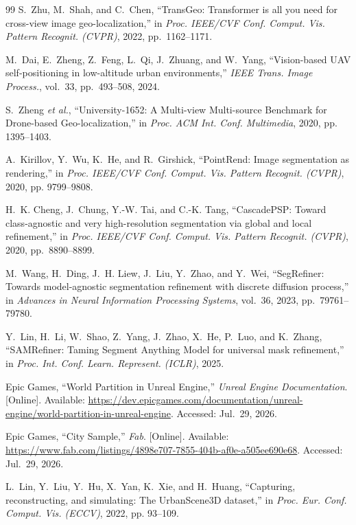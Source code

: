 \documentclass[letterpaper,journal]{IEEEtran}
\begin{document}
\begin{thebibliography}{99}
S.~Zhu, M.~Shah, and C.~Chen, ``TransGeo: Transformer is all you need for cross-view image geo-localization,'' in \textit{Proc. IEEE/CVF Conf. Comput. Vis. Pattern Recognit. (CVPR)}, 2022, pp.~1162--1171.

M.~Dai, E.~Zheng, Z.~Feng, L.~Qi, J.~Zhuang, and W.~Yang, ``Vision-based UAV self-positioning in low-altitude urban environments,'' \textit{IEEE Trans. Image Process.}, vol.~33, pp.~493--508, 2024.

S.~Zheng \textit{et al.}, ``University-1652: A Multi-view Multi-source Benchmark for Drone-based Geo-localization,'' in \textit{Proc. ACM Int. Conf. Multimedia}, 2020, pp. 1395--1403.

A.~Kirillov, Y.~Wu, K.~He, and R.~Girshick, ``PointRend: Image segmentation as rendering,'' in \textit{Proc. IEEE/CVF Conf. Comput. Vis. Pattern Recognit. (CVPR)}, 2020, pp. 9799--9808.

H.~K. Cheng, J.~Chung, Y.-W. Tai, and C.-K. Tang, ``CascadePSP: Toward class-agnostic and very high-resolution segmentation via global and local refinement,'' in \textit{Proc. IEEE/CVF Conf. Comput. Vis. Pattern Recognit. (CVPR)}, 2020, pp.~8890--8899.

M.~Wang, H.~Ding, J.~H. Liew, J.~Liu, Y.~Zhao, and Y.~Wei, ``SegRefiner: Towards model-agnostic segmentation refinement with discrete diffusion process,'' in \textit{Advances in Neural Information Processing Systems}, vol.~36, 2023, pp.~79761--79780.

Y.~Lin, H.~Li, W.~Shao, Z.~Yang, J.~Zhao, X.~He, P.~Luo, and K.~Zhang, ``SAMRefiner: Taming Segment Anything Model for universal mask refinement,'' in \textit{Proc. Int. Conf. Learn. Represent. (ICLR)}, 2025.

Epic Games, ``World Partition in Unreal Engine,'' \textit{Unreal Engine Documentation}. [Online]. Available: \url{https://dev.epicgames.com/documentation/unreal-engine/world-partition-in-unreal-engine}. Accessed: Jul.~29, 2026.

Epic Games, ``City Sample,'' \textit{Fab}. [Online]. Available: \url{https://www.fab.com/listings/4898e707-7855-404b-af0e-a505ee690e68}. Accessed: Jul.~29, 2026.

L.~Lin, Y.~Liu, Y.~Hu, X.~Yan, K.~Xie, and H.~Huang, ``Capturing, reconstructing, and simulating: The UrbanScene3D dataset,'' in \textit{Proc. Eur. Conf. Comput. Vis. (ECCV)}, 2022, pp. 93--109.


\end{thebibliography}
\end{document}
